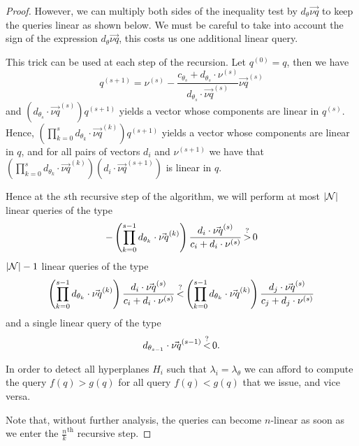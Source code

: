 \begin{proof}
However, we can multiply both sides of the inequality test by \(d_\theta
\vec{\nu q}\) to keep the queries linear as shown below. We must be careful to
take into account the sign of the expression \(d_\theta \vec{\nu q}\), this
costs us one additional linear query.

This trick can be used at each step of the recursion. Let \(q^{(0)} = q\),
then we have
$$
	q^{(s+1)} = \nu^{(s)} - \frac{c_{\theta_{s}} + d_{\theta_{s}} \cdot
	\nu^{(s)}}{d_{\theta_{s}} \cdot \vec{\nu q}^{(s)}}\vec{\nu q}^{(s)}
$$
and \( (d_{\theta_{s}}\cdot \vec{\nu q}^{(s)}) q^{(s+1)}\) yields a vector
whose components are linear in \(q^{(s)}\).
Hence,
\( (\prod_{k=0}^{s} d_{\theta_{k}} \cdot \vec{\nu q}^{(k)})
 q^{(s+1)}\) yields a vector
whose components are linear in \(q\),
and for all pairs of vectors \(d_i\) and \(\nu^{(s+1)}\)
we have that \( (\prod_{k=0}^{s} d_{\theta_{k}} \cdot \vec{\nu q}^{(k)}) (d_i
\cdot \vec{\nu q}^{(s+1)})\) is linear in \(q\).

Hence at the $s$th recursive step of the algorithm, we will perform
at most \(|{\mathcal{N}}|\) linear queries of the type
$$
	-\left(\prod_{k=0}^{s-1} d_{\theta_{k}} \cdot \vec{\nu q}^{(k)}\right)
\frac{d_i \cdot \vec{\nu q}^{(s)}}{c_i + d_i \cdot
	\nu^{(s)}} \mathop{>}^{?} 0
$$
\(|{\mathcal{N}}| - 1\) linear queries of the type
$$
	\left(\prod_{k=0}^{s-1} d_{\theta_{k}} \cdot \vec{\nu q}^{(k)}\right)
	\frac{d_i \cdot \vec{\nu q}^{(s)}}{c_i + d_i \cdot \nu^{(s)}}
\mathop{<}^{?}
\left(\prod_{k=0}^{s-1} d_{\theta_{k}} \cdot \vec{\nu q}^{(k)}\right)
\frac{d_j \cdot \vec{\nu q}^{(s)}}{c_j + d_j \cdot \nu^{(s)}}
$$
and a single linear query of the type
$$
	d_{\theta_{s-1}} \cdot \vec{\nu q}^{(s-1)} \mathop{<}^{?} 0.
$$

In order to detect all hyperplanes \(H_i\) such that \(\lambda_i =
\lambda_\theta\) we can afford to compute the query $f(q) > g(q)$ for all query
$f(q) < g(q)$ that we issue, and vice versa.

Note that, without further analysis, the queries can become \(n\)-linear as
soon as we enter the \(\frac{n}{k}^{\text{th}}\) recursive step.
\end{proof}

